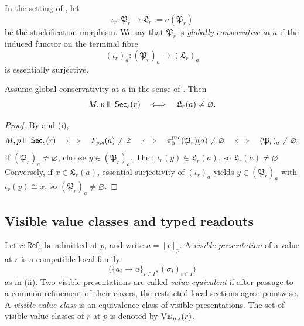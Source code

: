 \begin{definition}\label{def:global-conservativity}
In the setting of , let
\[
\iota_r:\mathfrak P_r\to \mathfrak L_r:=a(\mathfrak P_r)
\]
be the stackification morphism. We say that $\mathfrak P_r$ is \emph{globally conservative at $a$} if the induced functor on the terminal fibre
\[
(\iota_r)_a:(\mathfrak P_r)_a\to (\mathfrak L_r)_a
\]
is essentially surjective.
\end{definition}

\begin{proposition}\label{prop:no-new-global-objects}
Assume global conservativity at $a$ in the sense of . Then
\[
M,p\Vdash \mathsf{Sec}_s(r)
\quad\Longleftrightarrow\quad
\mathfrak L_r(a)\neq\varnothing.
\]
\end{proposition}

\begin{proof}
By  and (i),
\[
M,p\Vdash \mathsf{Sec}_s(r)
\quad\Longleftrightarrow\quad
F_{p,s}(a)\neq\varnothing
\quad\Longleftrightarrow\quad
\pi_0^{\mathrm{pre}}(\mathfrak P_r)(a)\neq\varnothing
\quad\Longleftrightarrow\quad
(\mathfrak P_r)_a\neq\varnothing.
\]
If $(\mathfrak P_r)_a\neq\varnothing$, choose $y\in (\mathfrak P_r)_a$. Then $\iota_r(y)\in \mathfrak L_r(a)$, so $\mathfrak L_r(a)\neq\varnothing$. Conversely, if $x\in \mathfrak L_r(a)$, essential surjectivity of $(\iota_r)_a$ yields $y\in (\mathfrak P_r)_a$ with $\iota_r(y)\cong x$, so $(\mathfrak P_r)_a\neq\varnothing$.
\end{proof}

\subsection{Visible value classes and typed readouts}

\begin{definition}\label{def:visible-value-classes}
Let $r:\mathsf{Ref}_s$ be admitted at $p$, and write $a=[r]_p$. A \emph{visible presentation} of a value at $r$ is a compatible local family
\[
\bigl(\{a_i\to a\}_{i\in I},(\sigma_i)_{i\in I}\bigr)
\]
as in (ii). Two visible presentations are called \emph{value-equivalent} if after passage to a common refinement of their covers, the restricted local sections agree pointwise. A \emph{visible value class} is an equivalence class of visible presentations. The set of visible value classes of $r$ at $p$ is denoted by $\mathrm{Vis}_{p,s}(r)$.
\end{definition}

